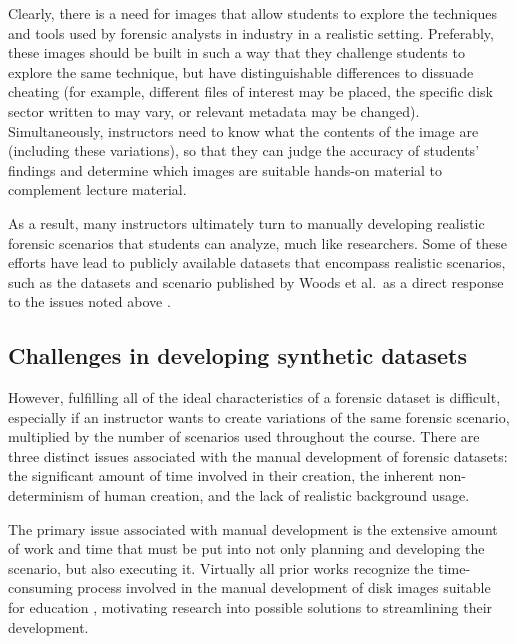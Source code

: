 \documentclass[letterpaper,12pt]{report}
\begin{document}
Clearly, there is a need for images that allow students to explore the
techniques and tools used by forensic analysts in industry in a
realistic setting. Preferably, these images should be built in such a
way that they challenge students to explore the same technique, but have
distinguishable differences to dissuade cheating (for example, different
files of interest may be placed, the specific disk sector written to may
vary, or relevant metadata may be changed). Simultaneously, instructors
need to know what the contents of the image are (including these
variations), so that they can judge the accuracy of students' findings
and determine which images are suitable hands-on material to complement
lecture material.

As a result, many instructors ultimately turn to manually developing
realistic forensic scenarios that students can analyze, much like
researchers. Some of these efforts have lead to publicly available
datasets that encompass realistic scenarios, such as the datasets and
scenario published by Woods et al.~as a direct response to the issues
noted above \cite{woodsCreatingRealisticCorpora2011}.

\subsection{Challenges in developing synthetic
datasets}\label{challenges-in-developing-synthetic-datasets}

However, fulfilling all of the ideal characteristics of a forensic
dataset is difficult, especially if an instructor wants to create
variations of the same forensic scenario, multiplied by the number of
scenarios used throughout the course. There are three distinct issues
associated with the manual development of forensic datasets: the
significant amount of time involved in their creation, the inherent
non-determinism of human creation, and the lack of realistic background
usage.

The primary issue associated with manual development is the extensive
amount of work and time that must be put into not only planning and
developing the scenario, but also executing it. Virtually all prior
works recognize the time-consuming process involved in the manual
development of disk images suitable for education
\cite{adelsteinAutomaticallyCreatingRealistic2005,gobelForTraceHolisticForensic2022,guptaDigitalForensicsLab2022,mochForensicImageGenerator2009,russellForensicImageDescription2012,scanlonEviPlantEfficientDigital2017,woodsCreatingRealisticCorpora2011},
motivating research into possible solutions to streamlining their
development.
\end{document}
